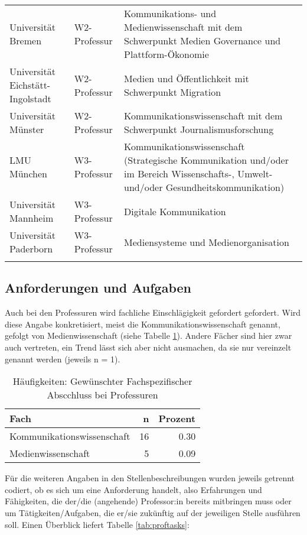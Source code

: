 \documentclass[
]{article}
\begin{document}
\begin{longtable}[t]{>{\raggedright\arraybackslash}p{2cm}>{\raggedright\arraybackslash}p{3cm}>{\raggedright\arraybackslash}p{6cm}}
Universität Bremen & W2-Professur & Kommunikations- und Medienwissenschaft mit dem Schwerpunkt Medien Governance und Plattform-Ökonomie\\
Universität Eichstätt-Ingolstadt & W2-Professur & Medien und Öffentlichkeit mit Schwerpunkt Migration\\
\addlinespace
Universität Münster & W2-Professur & Kommunikationswissenschaft mit dem Schwerpunkt Journalismusforschung\\
LMU München & W3-Professur & Kommunikationswissenschaft (Strategische Kommunikation und/oder im Bereich Wissenschafts-, Umwelt- und/oder Gesundheitskommunikation)\\
Universität Mannheim & W3-Professur & Digitale Kommunikation\\
Universität Paderborn & W3-Professur & Mediensysteme und Medienorganisation\\*
\end{longtable}

\hypertarget{anforderungen-und-aufgaben-1}{%
\subsection{Anforderungen und Aufgaben}\label{anforderungen-und-aufgaben-1}}

Auch bei den Professuren wird fachliche Einschlägigkeit gefordert gefordert. Wird diese Angabe konkretisiert, meist die Kommunikationswissenschaft genannt, gefolgt von Medienwissenschaft (siehe Tabelle \ref{tab:profsubject}). Andere Fächer sind hier zwar auch vertreten, ein Trend lässt sich aber nicht ausmachen, da sie nur vereinzelt genannt werden (jeweils n = 1).

\begin{table}[H]

\caption{\label{tab:profsubject}Häufigkeiten: Gewünschter Fachspezifischer Abscchluss bei Professuren}
\centering
\begin{tabular}[t]{l|r|r}
\hline
Fach & n & Prozent\\
\hline
Kommunikationswissenschaft & 16 & 0.30\\
\hline
Medienwissenschaft & 5 & 0.09\\
\hline
\end{tabular}
\end{table}

Für die weiteren Angaben in den Stellenbeschreibungen wurden jeweils getrennt codiert, ob es sich um eine Anforderung handelt, also Erfahrungen und Fähigkeiten, die der/die (angehende) Professor:in bereits mitbringen muss oder um Tätigkeiten/Aufgaben, die er/sie zukünftig auf der jeweiligen Stelle ausführen soll. Einen Überblick liefert Tabelle \ref{tab:proftasks}:
\end{document}
